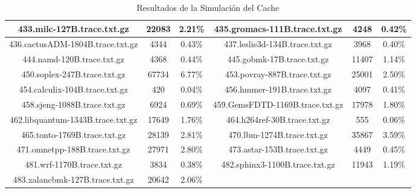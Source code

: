 \begin{table}[H]
\begin{tabular}{|c|c|c|c|c|c|}
433.milc-127B.trace.txt.gz & 22083 & 2.21\% & 435.gromacs-111B.trace.txt.gz & 4248 & 0.42\% \\\hline
436.cactusADM-1804B.trace.txt.gz & 4344 & 0.43\% & 437.leslie3d-134B.trace.txt.gz & 3968 & 0.40\% \\\hline
444.namd-120B.trace.txt.gz & 4368 & 0.44\% & 445.gobmk-17B.trace.txt.gz & 11407 & 1.14\% \\\hline
450.soplex-247B.trace.txt.gz & 67734 & 6.77\% & 453.povray-887B.trace.txt.gz & 25001 & 2.50\% \\\hline
454.calculix-104B.trace.txt.gz & 420 & 0.04\% & 456.hmmer-191B.trace.txt.gz & 4097 & 0.41\% \\\hline
458.sjeng-1088B.trace.txt.gz & 6924 & 0.69\% & 459.GemsFDTD-1169B.trace.txt.gz & 17978 & 1.80\% \\\hline
462.libquantum-1343B.trace.txt.gz & 17649 & 1.76\% & 464.h264ref-30B.trace.txt.gz & 555 & 0.06\% \\\hline
465.tonto-1769B.trace.txt.gz & 28139 & 2.81\% & 470.lbm-1274B.trace.txt.gz & 35867 & 3.59\% \\\hline
471.omnetpp-188B.trace.txt.gz & 27971 & 2.80\% & 473.astar-153B.trace.txt.gz & 4449 & 0.45\% \\\hline
481.wrf-1170B.trace.txt.gz & 3834 & 0.38\% & 482.sphinx3-1100B.trace.txt.gz & 11943 & 1.19\% \\\hline
483.xalancbmk-127B.trace.txt.gz & 20642 & 2.06\% & & & &  \\\hline
\hline
\end{tabular}
\caption{Resultados de la Simulación del Cache}
\label{tab:cache_results}
\end{table}